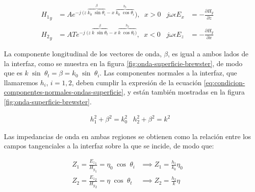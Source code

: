 \begin{subequations}
	\label{eq:ondas-superficie-campos}
	\begin{align}
	{H_1}_y &= A e^{-j\ (z\; \overbrace{k_0\;\sin \theta_i}^{\beta} - x\; \overbrace{k_0\;\cos \theta_i}^{h_1}}),\;\; x>0 & j\omega\epsilon E_x &= -\frac{\partial H_y}{\partial z} \\
	{H_2}_y &= A T e^{-j\; (z\; \overbrace{k\; \sin \theta_t}^{\beta} - x\; \overbrace{k\; \cos \theta_t)}^{h_2}},\;\; x<0   & j\omega\epsilon E_z &= -\frac{\partial H_y}{\partial x} 
	\end{align}
\end{subequations}

La componente longitudinal de los vectores de onda, $\beta$, es igual a ambos lados de la interfaz, como se muestra en la figura \ref{fig:onda-superficie-brewster}, de modo que es $k \; \sin \; \theta_t = \beta = k_0 \; \sin \; \theta_i$. Las componentes normales a la interfaz, que llamaremos $h_i$, $i=1,2$, deben cumplir la expresión de la ecuación \ref{eq:condicion-componentes-normales-ondas-superficie}, y están también mostradas en la figura \ref{fig:onda-superficie-brewster}.

\begin{align}
	\label{eq:condicion-componentes-normales-ondas-superficie}
	& h_1^2 + \beta^2 = k_0^2 &h_2^2 + \beta^2 = k^2
\end{align}

Las impedancias de onda en ambas regiones se obtienen como la relación entre los campos tangenciales a la interfaz sobre la que se incide, de modo que:

\begin{subequations}
\label{eq:impedancia-onda-superficie}
\begin{align}
	Z_1 = \frac{{E_z}_1}{{H_y}_1} = \eta_0 \; \cos\; \theta_i &\implies Z_1 = \frac{h_1}{k_0} \eta_0 \label{eq:impedancia-onda-incidente-onda-sup}\\
	Z_2 = \frac{{E_z}_2}{{H_y}_2} = \eta \; \cos \; \theta_t &\implies Z_2 = \frac{h_2}{k} \eta \label{eq:impedancia-onda-transmitida-onda-sup}
\end{align}
\end{subequations}

